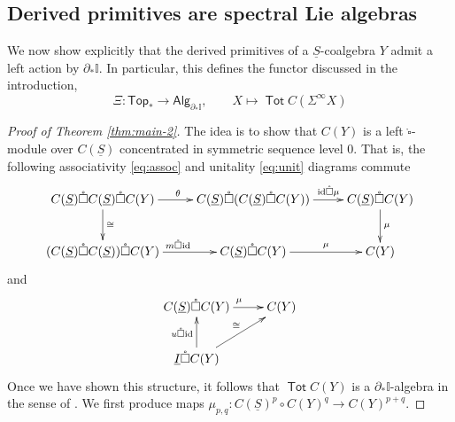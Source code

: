 \documentclass[12pt]{amsart}
\theoremstyle{definition}
\theoremstyle{remark}
\newcommand{\Top}{\mathsf{Top}_*}
\newcommand{\Sp}{\Sigma^{\infty}}
\newcommand{\Tot}{\operatorname{\mathsf{Tot}}}
\newcommand{\id}{\mathrm{id}}
\newcommand{\Id}{\mathbb{I}}
\newcommand{\boxcirc}{\mathring{\square}}
\newcommand{\uS}{\underline{S}}
\begin{document}
\subsection{Derived primitives are spectral Lie algebras}
We now show explicitly that the derived primitives of a $\uS$-coalgebra $Y$ admit a left action by $\partial_*\Id$. In particular, this defines the functor discussed in the introduction, \[ \Xi \colon \Top \to \mathsf{Alg}_{\partial_*\Id}, \quad \quad X\mapsto \Tot C(\Sp X)\]

\begin{proof}[Proof of Theorem \ref{thm:main-2}]The idea is to show that $C(Y)$ is a left $\boxcirc$-module over $C(\uS)$ concentrated in symmetric sequence level $0$. That is, the following associativity \eqref{eq:assoc} and unitality \eqref{eq:unit} diagrams commute \begin{equation} \label{eq:assoc}
    \xymatrix{
        C(\uS)\boxcirc C(\uS)\boxcirc C(Y) \ar[r]^{\theta} \ar[d]^-{\cong}
        &
        C(\uS)\boxcirc (C(\uS)\boxcirc C(Y)) \ar[r]^-{\id\boxcirc \mu}
        &
        C(\uS) \boxcirc C(Y) \ar[d]^-{\mu}
        \\
        (C(\uS)\boxcirc C(\uS))\boxcirc C(Y) \ar[r]^{m\boxcirc \id}
        &
        C(\uS)\boxcirc C(Y) \ar[r]^-{\mu}
        & 
        C(Y)
    }
    \end{equation}
    and 
    \begin{equation} \label{eq:unit} \xymatrix{
        C(\uS) \boxcirc C(Y) \ar[r]^{\mu}
        &
        C(Y)
        \\
        \underline{I}\boxcirc C(Y) \ar[u]^-{u \boxcirc \id} \ar[ur]^-{\cong}
    }
    \end{equation}
Once we have shown this structure, it follows that $\Tot C(Y)$ is a $\partial_*\Id$-algebra in the sense of \cite[Definition 6.36]{Clark-1}. We first produce maps $\mu_{p,q}\colon C(\uS)^p \circ C(Y)^q \to C(Y)^{p+q}$. 


\end{proof}
\end{document}
